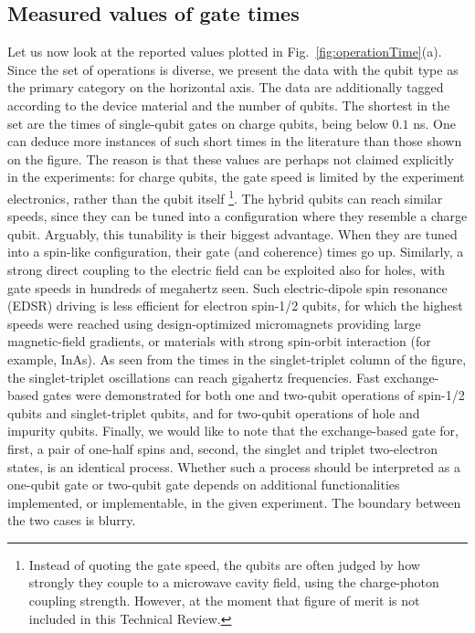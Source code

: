 \documentclass[aps, prx, showpacs, twocolumn, superscriptaddress, notitlepage, longbibliography, floatfix, nofootinbib]{revtex4-2}
\newcommand{\recheck}[1]{{#1}}
\begin{document}
\subsection{Measured values of gate times}

Let us now look at the reported values plotted in Fig.~\ref{fig:operationTime}(a). Since the set of operations is diverse, we present the data with the qubit type as the primary category on the horizontal axis. The data are additionally tagged according to the device material and the number of qubits. \recheck{The shortest in the set are the times of single-qubit gates on charge qubits, being below $0.1$ ns.} One can deduce more instances of such short times in the literature than those shown on the figure. The reason is that these values are perhaps not claimed explicitly in the experiments: for charge qubits, the gate speed is limited by the experiment electronics, rather than the qubit itself \footnote{Instead of quoting the gate speed, the qubits are often judged by how strongly they couple to a microwave cavity field, using the charge-photon coupling strength. However, at the moment that figure of merit is not included in this Technical Review.}. \recheck{The hybrid qubits can reach similar speeds,} since they can be tuned into a configuration where they resemble a charge qubit. Arguably, this tunability is their biggest advantage. When they are tuned into a spin-like configuration, their gate (and coherence) times go up. Similarly, a strong direct coupling to the electric field can be exploited also for \recheck{holes, with gate speeds in hundreds of megahertz seen}. Such electric-dipole spin resonance (EDSR) driving is less efficient for electron spin-1/2 qubits, for which \recheck{the highest speeds were reached using design-optimized micromagnets providing large magnetic-field gradients, or materials with strong spin-orbit interaction (for example, InAs).} As seen from the times in the singlet-triplet column of the figure, the singlet-triplet oscillations can reach gigahertz frequencies. Fast exchange-based gates were demonstrated for both one and two-qubit operations of spin-1/2 qubits and singlet-triplet qubits, and for two-qubit operations of hole and impurity qubits. Finally, we would like to note that the exchange-based gate for, first, a pair of one-half spins and, second, the singlet and triplet two-electron states, is an identical process. Whether such a process should be interpreted as a one-qubit gate or two-qubit gate depends on additional functionalities implemented, or implementable, in the given experiment. The boundary between the two cases is blurry. 
\end{document}
